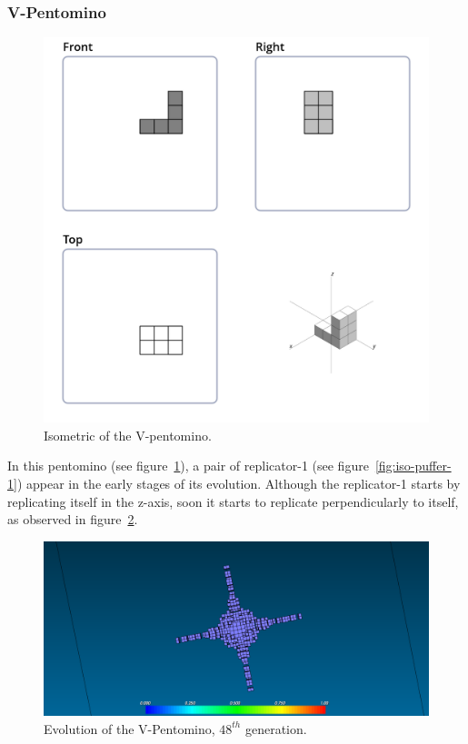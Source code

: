 \subsubsection{V-Pentomino}
\label{sec:v-pentomino}

\begin{figure}[H]
	\centering
	\includegraphics[scale=0.3]{iso_diagrams/v.png}
	\caption{Isometric of the V-pentomino.}
	\label{fig:iso-pent-v}
\end{figure}

In this pentomino (see figure~\ref{fig:iso-pent-v}), a pair of replicator-1 (see
figure~\ref{fig:iso-puffer-1}) appear in the early stages of its evolution.
Although the replicator-1 starts by replicating itself in the z-axis, soon it
starts to replicate perpendicularly to itself, as observed in
figure~\ref{fig:ss-pent:v-48}.

\begin{figure}[H]
	\centering
	\includegraphics[scale=0.3]{pentominoes_ss/v_48.png}
	\caption{Evolution of the V-Pentomino, $48^{th}$ generation.}
	\label{fig:ss-pent:v-48}
\end{figure}

